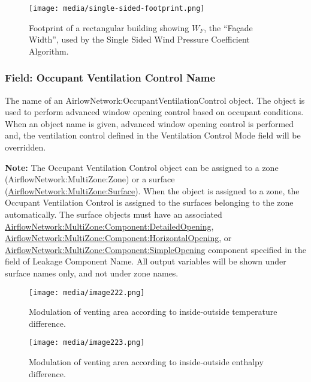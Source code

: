 \begin{figure}[hbtp]
\centering
\texttt{[image: media/single-sided-footprint.png]}
\caption{Footprint of a rectangular building showing $W_F$, the ``Fa\c{c}ade Width'', used by the Single Sided Wind Pressure Coefficient Algorithm. \protect \label{fig:single-sided-footprint}}
\end{figure}

\subsubsection{Field: Occupant Ventilation Control Name}\label{field-occupant-ventilation-control-name}

The name of an AirlowNetwork:OccupantVentilationControl object. The object is used to perform advanced window opening control based on occupant conditions. When an object name is given, advanced window opening control is performed and, the ventilation control defined in the Ventilation Control Mode field will be overridden.

\textbf{Note:} The Occupant Ventilation Control object can be assigned to a zone (AirflowNetwork:MultiZone:Zone) or a surface (\hyperref[airflownetworkmultizonesurface]{AirflowNetwork:MultiZone:Surface}). When the object is assigned to a zone, the Occupant Ventilation Control is assigned to the surfaces belonging to the zone automatically. The surface objects must have an associated \hyperref[airflownetworkmultizonecomponentdetailedopening]{AirflowNetwork:MultiZone:Component:DetailedOpening}, \hyperref[airflownetworkmultizonecomponenthorizontalopening]{AirflowNetwork:MultiZone:Component:HorizontalOpening}, or \hyperref[airflownetworkmultizonecomponentsimpleopening]{AirflowNetwork:MultiZone:Component:SimpleOpening} component specified in the field of Leakage Component Name. All output variables will be shown under surface names only, and not under zone names.

\begin{figure}[hbtp] %
\centering
\texttt{[image: media/image222.png]}
\caption{Modulation of venting area according to inside-outside temperature difference. \protect \label{fig:modulation-of-venting-area-according-to}}
\end{figure}

\begin{figure}[hbtp] %
\centering
\texttt{[image: media/image223.png]}
\caption{Modulation of venting area according to inside-outside enthalpy difference. \protect \label{fig:modulation-of-venting-area-according-to-001}}
\end{figure}

